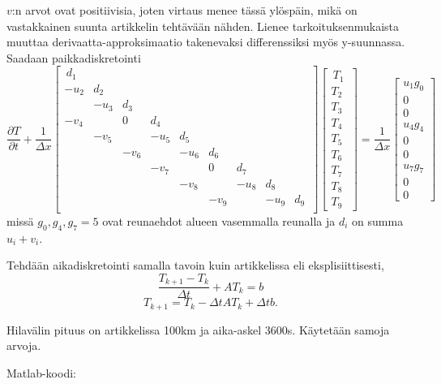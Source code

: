 \documentclass{article}
\begin{document}
$v$:n arvot ovat positiivisia, joten virtaus menee tässä ylöspäin, mikä on
vastakkainen suunta artikkelin tehtävään nähden. Lienee tarkoituksenmukaista
muuttaa derivaatta-approksimaatio takenevaksi differenssiksi myös y-suunnassa.
Saadaan paikkadiskretointi
\[
  \frac{\partial T}{\partial t} +
  \frac{1}{\Delta x}
  \begin{bmatrix}
    \,d_1 \\
    -u_2 & d_2 \\
       & -u_3 & d_3 \\
    -v_4 & & 0 & d_4 \\
       & -v_5 & & -u_5 & d_5 \\
       & & -v_6 & & -u_6 & d_6 \\
       & & & -v_7 & & 0 & d_7 \\
       & & & & -v_8 & & -u_8 & d_8 \\
       & & & & & -v_9 & & -u_9 & d_9 \,\\
  \end{bmatrix}
  \begin{bmatrix}
    \,T_1\, \\ T_2 \\ T_3 \\ T_4 \\ T_5 \\ T_6 \\ T_7 \\ T_8 \\ T_9
  \end{bmatrix}
  =
  \frac{1}{\Delta x}
  \begin{bmatrix}
    u_1 g_0 \\ 0 \\ 0 \\ u_4 g_4 \\ 0 \\ 0 \\ u_7 g_7 \\ 0 \\ 0
  \end{bmatrix}
\]
missä $g_0, g_4, g_7 = 5$ ovat reunaehdot alueen vasemmalla reunalla
ja $d_i$ on summa $u_i + v_i$.

Tehdään aikadiskretointi samalla tavoin kuin artikkelissa eli eksplisiittisesti,
\[
  \frac{T_{k+1} - T_k}{\Delta t} + AT_k = b
\]
\[
  T_{k+1} = T_k - \Delta t AT_k + \Delta t b.
\]

Hilavälin pituus on artikkelissa 100km ja aika-askel 3600s. Käytetään samoja arvoja.

Matlab-koodi:
\end{document}
